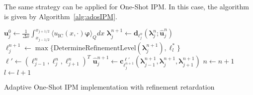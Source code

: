 The same strategy can be applied for One-Shot IPM. In this case, the algorithm is given by Algorithm~\ref{alg:adosIPM}.
\begin{algorithm}[H]
\begin{algorithmic}[1]
\State $\bm{u}_j^0 \leftarrow \frac{1}{\Delta x} \int_{x_{j-1/ 2}}^{x_{j+1/ 2}} \langle u_{\text{IC}}(x, \cdot) \bm{\varphi} \rangle_Q dx$
\EndFor
{}
\State $\bm{\lambda}_j^{n+1} \leftarrow \bm{d}_{\ell_j^n}(\bm{\lambda}_{j}^{n};\bm{\hat u}_j^{n})$
\State $\ell_j^{n+1}\leftarrow \max\{\text{DetermineRefinementLevel}\left(\bm{\lambda}_j^{n+1}\right),\ell_l^*\}$
\State $\bm\ell' \leftarrow (\ell_{j-1}^n,\ell_{j}^n,\ell_{j+1}^n)^T$
\State $\bm{\hat u}_j^{n+1} \leftarrow \bm{c}_{\ell_j^{n+1}}^{\bm\ell'}(\bm{\lambda}_{j-1}^{n+1},\bm{\lambda}_j^{n+1},\bm{\lambda}_{j+1}^{n+1})$
\EndFor
\State $n \leftarrow n+1$
\State $l \leftarrow l+1$
\EndIf
\EndWhile
\end{algorithmic}
\caption{Adaptive One-Shot IPM implementation with refinement retardation}
\label{alg:adosIPM}
\end{algorithm}


